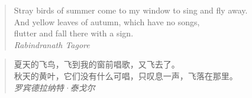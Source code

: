 \documentclass[12pt,a4paper]{article}
\begin{document}
\begin{verse}
  Stray birds of summer come to my window to sing and fly away. \\
  And yellow leaves of autumn, which have no songs, \\
  flutter and fall there with a sign.\\
  \hfill \emph{Rabindranath Tagore}
\end{verse}

\begin{verse}
  夏天的飞鸟，飞到我的窗前唱歌，又飞去了。\\
  秋天的黄叶，它们没有什么可唱，只叹息一声，飞落在那里。\\
  \hfill \emph{罗宾德拉纳特·泰戈尔}
\end{verse}
\end{document}
